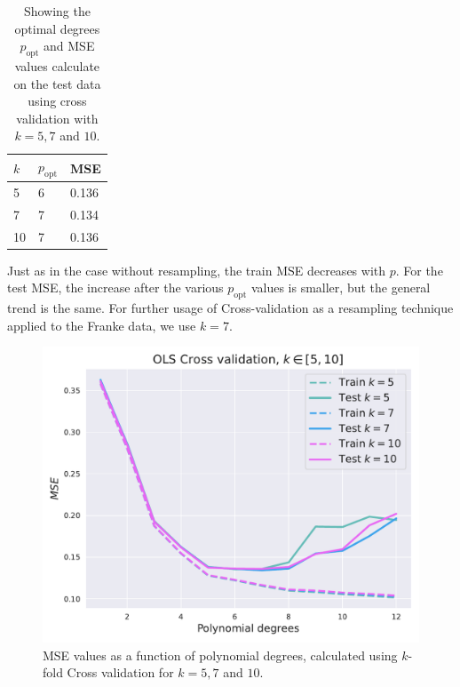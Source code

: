 \documentclass[twocolumn,english,notitlepage]{article}
\newcommand{\msub}[2]{\ensuremath{{#1}_\text{#2}}}
\begin{document}
            \begin{table}[H]
                \centering
                \begin{tabular}{l|ll}
                $k$ & $\msub{p}{opt}$ & MSE \\
                \hline
                5   & 6         & 0.136 \\
                7   & 7         & 0.134 \\
                10  & 7         & 0.136
                \end{tabular}
                \caption{Showing the optimal degrees $\msub{p}{opt}$ and MSE values calculate on the test data using cross validation with $k = 5, 7$ and $10$.}
                \label{res:tab:OLS_kfold_optimal}
            \end{table}
            
            Just as in the case without resampling, the train MSE decreases with $p$. For the test MSE, the increase after the various $\msub{p}{opt}$ values is smaller, but the general trend is the same. For further usage of Cross-validation as a resampling technique applied to the Franke data, we use $k = 7$.   
            
            \begin{figure}[H]
                \centering
                \includegraphics[width=\linewidth]{OLS_mse_kfold.pdf}
                \caption{MSE values as a function of polynomial degrees, calculated using $k$-fold Cross validation for $k = 5, 7$ and $10$. }
                \label{fig:res:OLS_mse_kfold}
            \end{figure}
\end{document}
